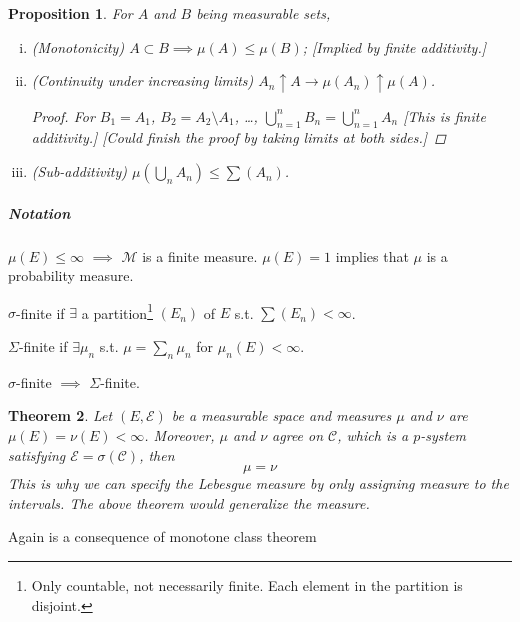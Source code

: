 \documentclass[11pt]{article}
\newcommand{\m}{\mathcal}
\newtheorem{theorem}{Theorem}[subsection]
\newtheorem{proposition}[theorem]{Proposition}
\begin{document}
        \begin{proposition}
          For $A$ and $B$ being measurable sets, 
          \begin{enumerate}[(i)]
            \item (Monotonicity) $A \subset B \implies \mu(A) \le \mu (B)$;  [Implied by
              finite additivity.]
            \item (Continuity under increasing limits) $A_n \uparrow A \to \mu (A_n)
              \uparrow \mu(A)$. 

              \begin{proof}
                For $B_1 = A_1$, $B_2 = A_2 \setminus A_1$, \dots, $\bigcup _{n=1}^n B_n
                = \bigcup _{n=1}^n A_n$ [This is finite additivity.] 
                \label{Homework} [Could finish the proof by taking limits at both
                sides.]
              \end{proof}
            \item (Sub-additivity) $\mu (\bigcup _ n A_n) \le \sum (A_n)$.
          \end{enumerate}
        \end{proposition}

        \subparagraph{Notation}
        $\mu(E) \le \infty$ $\implies $ $\mathcal M$ is a finite measure.
        $\mu(E) = 1$ implies that $\mu$ is a probability measure. 

        $\sigma$-finite if $\exists $ a partition\footnote{Only countable, not
        necessarily finite. Each element in the partition is disjoint.} $(E_n)$ of $E$ s.t. $\sum (E_n) < \infty$. 

        $\Sigma$-finite if $\exists \mu_n$ s.t. $\mu = \sum _n \mu _n $ for $\mu_n(E) <
        \infty$. 

        $\sigma$-finite $\implies$ $\Sigma$-finite.

        \begin{theorem}
          Let $(E, \mathcal E)$ be a measurable space and measures $\mu $ and $\nu$ are
          $\mu(E) = \nu(E) < \infty$. Moreover, $\mu$ and $\nu$ agree on $\mathcal C$,
          which is a $p$-system satisfying $\mathcal E = \sigma (\m C)$, then 
          \[
            \mu = \nu
          \]
          This is why we can specify the Lebesgue measure by only assigning measure to
          the intervals. The above theorem would generalize the measure. 
          \label{thm:}
        \end{theorem}
        Again is a consequence of monotone class theorem
\end{document}
